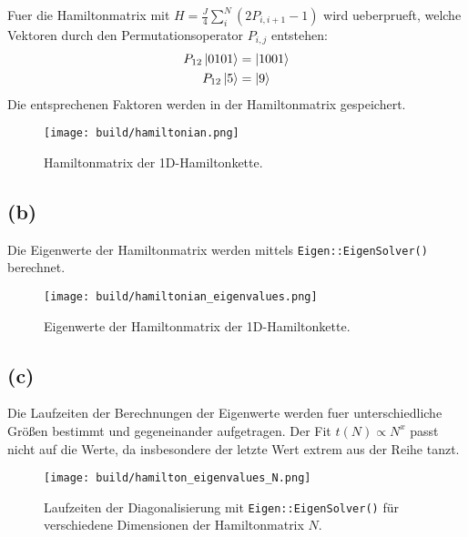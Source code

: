 \documentclass{scrartcl}
\begin{document}
Fuer die Hamiltonmatrix mit $H = \frac{J}{4} \sum_{i}^{N} \left(2 P_{i,i+1} - 1\right)$ wird ueberprueft,
welche Vektoren durch den Permutationsoperator $P_{i,j}$ entstehen:
\begin{align}
  P_{12}\ket{0 1 0 1} &= \ket{1 0 0 1} \\
        P_{12}\ket{5} &= \ket{9} \\
\end{align}
Die entsprechenen Faktoren werden in der Hamiltonmatrix gespeichert.
\begin{figure}[ht]
  \centering
  \texttt{[image: build/hamiltonian.png]}
  \caption{Hamiltonmatrix der 1D-Hamiltonkette.}%
  \label{fig:hamiltonkette}
\end{figure}

\subsection*{(b)}
Die Eigenwerte der Hamiltonmatrix werden mittels \texttt{Eigen::EigenSolver()} berechnet.
\begin{figure}[ht]
  \centering
  \texttt{[image: build/hamiltonian\_eigenvalues.png]}
  \caption{Eigenwerte der Hamiltonmatrix der 1D-Hamiltonkette.}%
  \label{fig:hamiltonkette_eigenvalues}
\end{figure}

\subsection*{(c)}
Die Laufzeiten der Berechnungen der Eigenwerte werden fuer unterschiedliche Größen bestimmt und gegeneinander aufgetragen.
Der Fit $t\left(N\right) \propto N^x$ passt nicht auf die Werte, da insbesondere der letzte Wert extrem aus der Reihe tanzt.
\begin{figure}[ht]
  \centering
  \texttt{[image: build/hamilton\_eigenvalues\_N.png]}
  \caption{%
    Laufzeiten der Diagonalisierung mit \texttt{Eigen::EigenSolver()} für verschiedene Dimensionen der Hamiltonmatrix $N$.
  }%
  \label{fig:build/hamilton_eigenvalues_N}
\end{figure}
\end{document}
